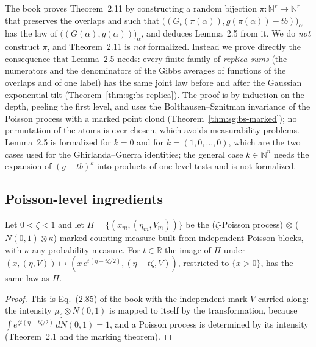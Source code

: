\begin{remark}
The book proves Theorem~2.11 by constructing a random bijection $\pi:\mathbb N^r\to\mathbb N^r$ that preserves the
overlaps and such that $\big((G_t(\pi(\alpha)),g(\pi(\alpha))-tb)\big)_\alpha$ has the law of $\big((G(\alpha),g(\alpha))\big)_\alpha$,
and deduces Lemma~2.5 from it. We do \emph{not} construct $\pi$, and Theorem~2.11 is \emph{not} formalized. Instead we prove
directly the consequence that Lemma~2.5 needs: every finite family of \emph{replica sums} (the numerators and the
denominators of the Gibbs averages of functions of the overlaps and of one label) has the same joint law
before and after the Gaussian exponential tilt (Theorem~\ref{thm:sg:bs-replica}). The proof is by induction on the depth, peeling the first level, and uses
the Bolthausen--Sznitman invariance of the Poisson process with a marked point cloud
(Theorem~\ref{thm:sg:bs-marked}); no permutation of the atoms is ever chosen, which avoids measurability problems.
Lemma~2.5 is formalized for $k=0$ and for $k=(1,0,\dots,0)$, which are the two cases used for the
Ghirlanda--Guerra identities; the general case $k\in\mathbb N^n$ needs the expansion of $(g-tb)^k$ into
products of one-level tests and is not formalized.
\end{remark}

\subsection*{Poisson-level ingredients}

\begin{theorem}\label{thm:sg:bs-marked}
  \leanok
Let $0<\zeta<1$ and let $\Pi=\{(x_m,(\eta_m,V_m))\}$ be the ($\zeta$-Poisson process) $\otimes$ ($N(0,1)\otimes\kappa$)-marked
counting measure built from independent Poisson blocks, with $\kappa$ any probability measure. For $t\in\mathbb R$ the image of $\Pi$ under
$(x,(\eta,V))\mapsto(x\,e^{t(\eta-t\zeta/2)},(\eta-t\zeta,V))$, restricted to $\{x>0\}$, has the same law as $\Pi$.
\end{theorem}
\begin{proof}
  \leanok
This is Eq.~(2.85) of the book with the independent mark $V$ carried along: the intensity $\mu_\zeta\otimes N(0,1)$ is mapped
to itself by the transformation, because $\int e^{\zeta t(\eta-t\zeta/2)}\,dN(0,1)=1$, and a Poisson process is determined by its
intensity (Theorem~2.1 and the marking theorem).
\end{proof}


